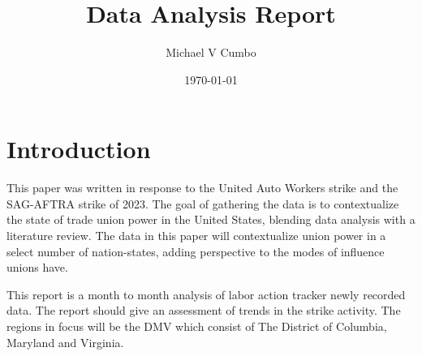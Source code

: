 \documentclass[11pt]{article}\usepackage[]{graphicx}\usepackage[]{xcolor}
\title{\textbf{Data Analysis Report}}
\author{Michael V Cumbo}
\date{\today}
\begin{document}
\maketitle

\section{Introduction}
This paper was written in response to the United Auto Workers strike and the SAG-AFTRA strike of 2023. The goal of gathering the data is to contextualize the state of trade union power in the United States, blending data analysis with a literature review. 
The data in this paper will contextualize union power in a select number of nation-states, adding perspective to the modes of influence unions have.

This report is a month to month analysis of labor action tracker newly recorded data. The report should give an assessment of trends in the strike activity.
The regions in focus will be the DMV which consist of The District of Columbia, Maryland and Virginia.
\end{document}
